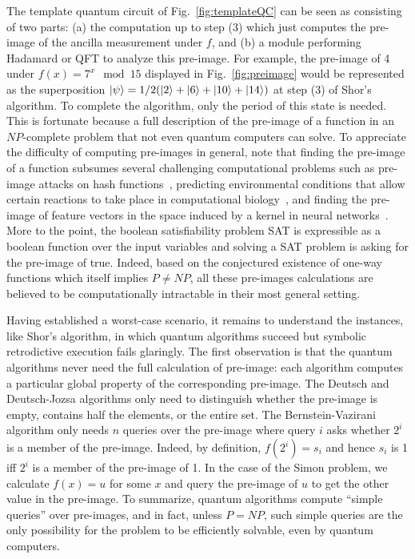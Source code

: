 \documentclass{article}
\begin{document}
\begin{refsection}
The template quantum circuit of Fig.~\ref{fig:templateQC} can be seen
as consisting of two parts: (a) the computation up to step (3) which
just computes the pre-image of the ancilla measurement under $f$, and
(b) a module performing Hadamard or QFT to analyze this pre-image. For
example, the pre-image of 4 under $f(x) = 7^x \mod 15$ displayed in
Fig.~\ref{fig:preimage} would be represented as the superposition
$\ket{\psi} = 1/2 (\ket{2} + \ket{6} + \ket{10} + \ket{14})$ at step
(3) of Shor's algorithm. To complete the algorithm, only the period of
this state is needed. This is fortunate because a full description of
the pre-image of a function in an $\mathit{NP}$-complete problem that
not even quantum computers can solve. To appreciate the difficulty of
computing pre-images in general, note that finding the pre-image of a
function subsumes several challenging computational problems such as
pre-image attacks on hash
functions~\cite{10.1007/978-3-540-25937-4_24}, predicting
environmental conditions that allow certain reactions to take place in
computational biology~\cite{Klotz2013,akutsu2009analyses}, and finding
the pre-image of feature vectors in the space induced by a kernel in
neural networks~\cite{1353287}. More to the point, the boolean
satisfiability problem SAT is expressible as a boolean function over
the input variables and solving a SAT problem is asking for the
pre-image of \textsf{true}. Indeed, based on the conjectured existence
of one-way functions which itself implies $\mathit{P} \neq
\mathit{NP}$, all these pre-images calculations are believed to be
computationally intractable in their most general setting.

Having established a worst-case scenario, it remains to understand the
instances, like Shor's algorithm, in which quantum algorithms succeed
but symbolic retrodictive execution fails glaringly. The first
observation is that the quantum algorithms never need the full
calculation of pre-image: each algorithm computes a particular global
property of the corresponding pre-image. The Deutsch and Deutsch-Jozsa
algorithms only need to distinguish whether the pre-image is empty,
contains half the elements, or the entire set. The Bernstein-Vazirani
algorithm only needs $n$ queries over the pre-image where query $i$
asks whether $2^i$ is a member of the pre-image. Indeed, by
definition, $f(2^i) = s_i$ and hence $s_i$ is 1 iff $2^i$ is a member
of the pre-image of 1. In the case of the Simon problem, we calculate
$f(x) = u$ for some $x$ and query the pre-image of $u$ to get the
other value in the pre-image. To summarize, quantum algorithms compute
``simple queries'' over pre-images, and in fact, unless
$\mathit{P}=\mathit{NP}$, such simple queries are the only possibility
for the problem to be efficiently solvable, even by quantum computers.


\end{refsection}
\end{document}
